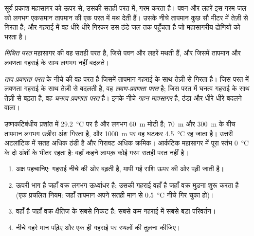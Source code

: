 सूर्य-प्रकाश महासागर को ऊपर से, उसकी सतही परत में, गरम करता है। पवन और लहरें इस गरम जल को
लगभग एकसमान तापमान की एक परत में मथ देती हैं। उसके नीचे तापमान कुछ
सौ मीटर में तेज़ी से गिरता है; और गहराई में वह धीरे-धीरे गिरकर उस ठंडे जल तक पहुँचता है जो
महासागरीय द्रोणियों को भरता है।

\begin{definition}[मिश्रित परत]\label{def:g10:layered-ocean:mixed-layer}
\emph{मिश्रित परत} महासागर की वह सतही परत है,
जिसे पवन और लहरें मथती हैं, और जिसमें तापमान और लवणता गहराई के साथ लगभग
नहीं बदलते।
\end{definition}

\begin{definition}\label{def:g10:layered-ocean:thermocline}
\emph{ताप-प्रवणता परत}  के नीचे की वह परत है
जिसमें तापमान गहराई के साथ तेज़ी से गिरता है। जिस परत में
लवणता गहराई के साथ तेज़ी से बदलती है, वह \emph{लवण-प्रवणता परत} है;
जिस परत में घनत्व गहराई के साथ तेज़ी से बढ़ता है, वह
\emph{घनत्व-प्रवणता परत} है। इनके नीचे \emph{गहन
महासागर} है, ठंडा और धीरे-धीरे बदलने वाला।
\end{definition}

उष्णकटिबंधीय प्रशांत में  \qty{29.2}{\degreeCelsius} पर है और
लगभग \qty{60}{m} मोटी है; \qty{70}{m} और \qty{300}{m} के बीच तापमान
लगभग उन्नीस अंश गिरता है, और \qty{1000}{m} पर वह घटकर
\qty{4.5}{\degreeCelsius} रह जाता है। उत्तरी अटलांटिक में सतह अधिक ठंडी है और
गिरावट अधिक क्रमिक। आर्कटिक महासागर में पूरा स्तंभ \qty{0}{\degreeCelsius} के
दो अंशों के भीतर रहता है: वहाँ कहने लायक़ कोई गरम सतही परत
नहीं है।

\begin{method}[महासागर का प्रोफ़ाइल पढ़ना]\label{met:g10:layered-ocean:profile}
\begin{enumerate}
  \item अक्ष पहचानिए: गहराई नीचे की ओर बढ़ती है, मापी गई राशि
        ऊपर की ओर पढ़ी जाती है।
  \item {} ऊपरी भाग है जहाँ वक्र लगभग
        ऊर्ध्वाधर है; उसकी गहराई वहाँ है जहाँ वक्र मुड़ना शुरू करता है (एक प्रचलित
        नियम: जहाँ तापमान अपने सतही मान से \qty{0.5}{\degreeCelsius}
        नीचे गिर चुका हो)।
  \item {} वहाँ है जहाँ वक्र क्षैतिज के सबसे निकट है: सबसे
        कम गहराई में सबसे बड़ा परिवर्तन।
  \item नीचे गहरे मान पढ़िए और एक ही गहराई पर स्थलों की तुलना कीजिए।
\end{enumerate}
\end{method}

